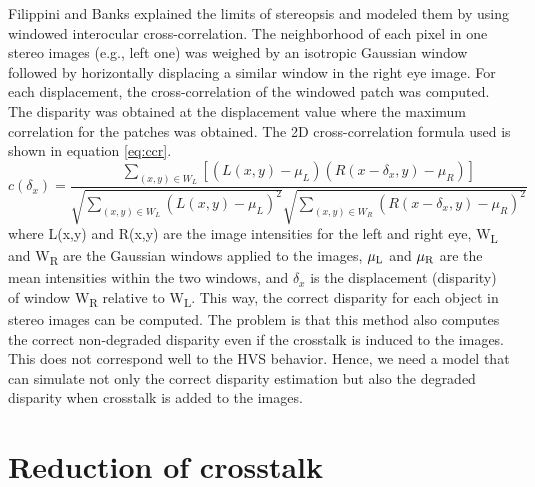 Filippini and Banks \cite{filippini2009limits} explained the limits of stereopsis and modeled them by using windowed interocular cross-correlation. The neighborhood of each pixel in one stereo images (e.g., left one) was weighed by an isotropic Gaussian window followed by horizontally displacing a similar window in the right eye image. For each displacement, the cross-correlation of the windowed patch was computed. The disparity was obtained at the displacement value where the maximum correlation for the patches was obtained. The 2D cross-correlation formula used is shown in equation \ref{eq:ccr}.
\begin{equation}
c(\delta_x) = \frac{ \sum\limits_{(x,y) \in W_L} [(L(x,y) - \mu_L)(R(x-\delta_x, y) - \mu_R)] }{\sqrt{\sum\limits_{(x,y) \in W_L}(L(x,y) - \mu_L)^2} \sqrt{\sum\limits_{(x,y) \in W_R}(R(x-\delta_x, y)- \mu_R)^2}}
\label{eq:ccr}
\end{equation}
where L(x,y) and R(x,y) are the image intensities for the left and right eye, W\textsubscript{L} and W\textsubscript{R} are the Gaussian windows applied to the images, $\mu\textsubscript{L}$ and $\mu\textsubscript{R}$ are the mean intensities within the two windows, and $\delta_x$ is the displacement (disparity) of window W\textsubscript{R} relative to W\textsubscript{L}. This way, the correct disparity for each object in stereo images can be computed. The problem is that this method also computes the correct non-degraded disparity even if the crosstalk is induced to the images. This does not correspond well to the HVS behavior. Hence, we need a model that can simulate not only the correct disparity estimation but also the degraded disparity when crosstalk is added to the images.

\section{Reduction of crosstalk}

